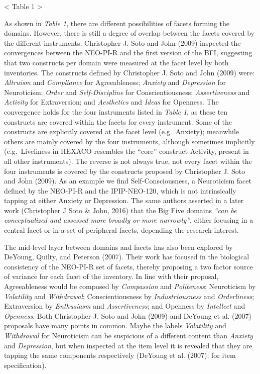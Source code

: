 \documentclass[,man,floatsintext]{apa6}
\begin{document}
\textless{} Table 1 \textgreater{}

\vspace{5mm}

As shown in \emph{Table 1}, there are different possibilities of facets
forming the domains. However, there is still a degree of overlap between
the facets covered by the different instruments. Christopher J. Soto and
John (2009) inspected the convergences between the NEO-PI-R and the
first version of the BFI, suggesting that two constructs per domain were
measured at the facet level by both inventories. The constructs defined
by Christopher J. Soto and John (2009) were: \emph{Altruism} and
\emph{Compliance} for Agreeableness; \emph{Anxiety} and
\emph{Depression} for Neuroticism; \emph{Order} and
\emph{Self-Discipline} for Conscientiousness; \emph{Assertiveness} and
\emph{Activity} for Extraversion; and \emph{Aesthetics} and \emph{Ideas}
for Openness. The convergence holds for the four instruments listed in
\emph{Table 1}, as these ten constructs are covered within the facets
for every instrument. Some of the constructs are explicitly covered at
the facet level (e.g.~Anxiety); meanwhile others are mainly covered by
the four instruments, although sometimes implicitly (e.g.~Liveliness in
HEXACO resembles the \enquote{core} construct Activity, present in all
other instruments). The reverse is not always true, not every facet
within the four instruments is covered by the constructs proposed by
Christopher J. Soto and John (2009). As an example we find
Self-Consciousness, a Neuroticism facet defined by the NEO-PI-R and the
IPIP-NEO-120, which is not intrinsically tapping at either Anxiety or
Depression. The same authors asserted in a later work (Christopher J
Soto \& John, 2016) that the Big Five domains \emph{\enquote{can be
conceptualized and assessed more broadly or more narrowly}}, either
focusing in a central facet or in a set of peripheral facets, depending
the research interest.

The mid-level layer between domains and facets has also been explored by
DeYoung, Quilty, and Peterson (2007). Their work has focused in the
biological consistency of the NEO-PI-R set of facets, thereby proposing
a two factor source of variance for each facet of the inventory. In line
with their proposal, Agreeableness would be composed by
\emph{Compassion} and \emph{Politeness}; Neuroticism by
\emph{Volatility} and \emph{Withdrawal}; Conscientiousness by
\emph{Industriousness} and \emph{Orderliness}; Extraversion by
\emph{Enthusiasm} and \emph{Assertiveness}; and Openness by
\emph{Intellect} and \emph{Openness}. Both Christopher J. Soto and John
(2009) and DeYoung et al. (2007) proposals have many points in common.
Maybe the labels \emph{Volatility} and \emph{Withdrawal} for Neuroticism
can be suspicious of a different content than \emph{Anxiety} and
\emph{Depression}, but when inspected at the item level it is revealed
that they are tapping the same components respectively (DeYoung et al.
(2007); for item specification).
\end{document}
